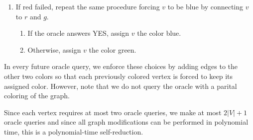 \documentclass[12pt]{article}
\begin{document}
\begin{solution}
\begin{enumerate}
        \item If red failed, repeat the same procedure forcing $v$ to be blue by connecting $v$ to $r$ and $g$.

        \begin{enumerate}
            \item If the oracle answers YES, assign $v$ the color blue.
            \item Otherwise, assign $v$ the color green.
        \end{enumerate}
    \end{enumerate}
    In every future oracle query, we enforce these choices by adding edges to the other two colors so that each previously colored vertex is forced to keep its assigned color. However, note that we do not query the oracle with a parital coloring of the graph. 

    Since each vertex requires at most two oracle queries, we make at most $2|V|+1$ oracle queries and since all graph modifications can be performed in polynomial time, this is a polynomial-time self-reduction.
\end{solution}
\end{document}
